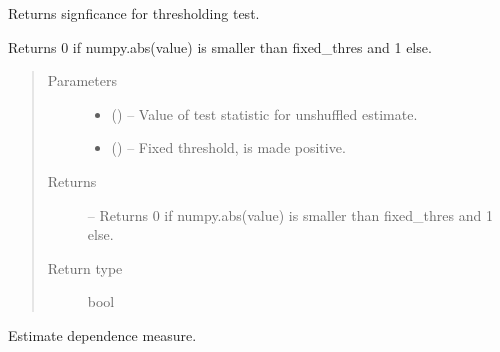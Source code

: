 \documentclass[letterpaper,10pt,english]{sphinxmanual}
\begin{document}
\begin{fulllineitems}
\begin{fulllineitems}
\end{fulllineitems}


\begin{fulllineitems}
\label{\detokenize{index:tigramite.independence_tests.CondIndTest.get_fixed_thres_significance}}
Returns signficance for thresholding test.

Returns 0 if numpy.abs(value) is smaller than fixed\_thres and 1 else.
\begin{quote}\begin{description}
\item[{Parameters}] \leavevmode\begin{itemize}
\item {} 
 () -- Value of test statistic for unshuffled estimate.

\item {} 
 () -- Fixed threshold, is made positive.

\end{itemize}

\item[{Returns}] \leavevmode
{} -- Returns 0 if numpy.abs(value) is smaller than fixed\_thres and 1
else.

\item[{Return type}] \leavevmode
bool

\end{description}\end{quote}

\end{fulllineitems}


\begin{fulllineitems}
\label{\detokenize{index:tigramite.independence_tests.CondIndTest.get_measure}}
Estimate dependence measure.


\end{fulllineitems}
\end{fulllineitems}
\end{document}
